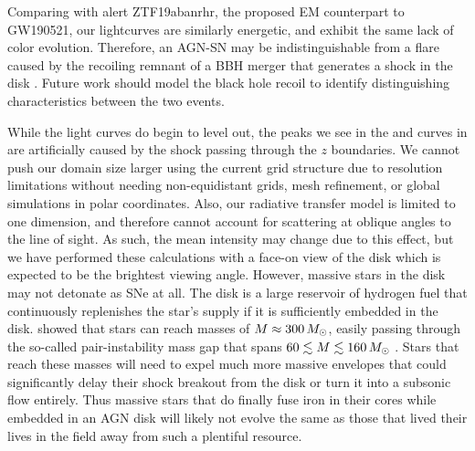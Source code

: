Comparing with alert ZTF19abanrhr, the proposed EM counterpart to GW190521, our lightcurves are similarly energetic, and exhibit the same lack of color evolution.
Therefore, an AGN-SN may be indistinguishable from a flare caused by the recoiling remnant of a BBH merger that generates a shock in the disk \citep{McKernan+19}. 
Future work should model the black hole recoil to identify distinguishing characteristics between the two events.

While the light curves do begin to level out, the peaks we see in the  and  curves in  are artificially caused by the shock passing through the $z$ boundaries.
We cannot push our domain size larger using the current grid structure due to resolution limitations without needing non-equidistant grids,  mesh refinement, or global simulations in polar coordinates.
Also, our radiative transfer model is limited to one dimension, and therefore cannot account for scattering at oblique angles to the line of sight.
As such, the mean intensity may change due to this effect, but we have performed these calculations with a face-on view of the disk which is expected to be the brightest viewing angle.
However, massive stars in the disk may not detonate as SNe at all.
The disk is a large reservoir of hydrogen fuel that continuously replenishes the star's supply if it is sufficiently embedded in the disk.
\citet{CantielloJermynLin21} showed that stars can reach masses of $M\approx300\,M_{\odot}$, easily passing through the so-called pair-instability mass gap that spans $60\lesssim M \lesssim 160\,M_{\odot}$ \citep{WoosleyHeger21}.
Stars that reach these masses will need to expel much more massive envelopes that could significantly delay their shock breakout from the disk or turn it into a subsonic flow entirely.
Thus massive stars that do finally fuse iron in their cores while embedded in an AGN disk will likely not evolve the same as those that lived their lives in the field away from such a plentiful resource.



